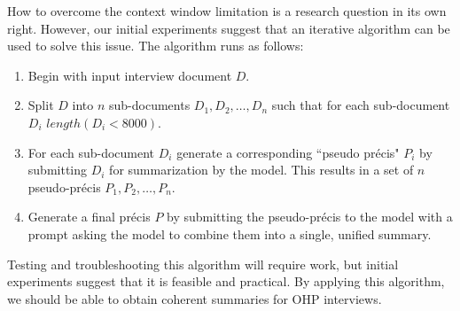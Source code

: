 \documentclass[12pt, oneside]{article}   	%
\begin{document}
How to overcome the context window limitation is  a  research question in its own right.  However, our initial experiments suggest that an iterative algorithm can be used to solve this issue.  The algorithm runs as follows:
\begin{enumerate}
\item Begin with input interview document $D$.
\item Split $D$ into $n$ sub-documents $D_1, D_2, \ldots, D_n$ such that  for each sub-document $D_i$ $length(D_i < 8000)$.
\item For each sub-document $D_i$ generate a corresponding ``pseudo pr\'{e}cis" $P_i$ by submitting $D_i$ for summarization by the model.  This results in a set of $n$ pseudo-pr\'{e}cis $P_1, P_2, \ldots, P_n$.
\item Generate a final pr\'{e}cis $P$ by submitting the pseudo-pr\'{e}cis to the model with a prompt asking the model to combine them into a single, unified summary.
\end{enumerate}
Testing and troubleshooting this algorithm will require  work, but initial experiments suggest that it is feasible and practical.  By applying this algorithm, we should be able to obtain coherent summaries for OHP interviews.
\end{document}

